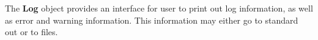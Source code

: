 %



The {\bf Log} object provides an interface for user to print out log information, as well
as error and warning information.   This information may either go to standard out or
to files.

